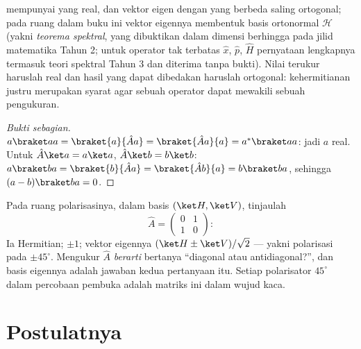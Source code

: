 \begin{theorem}\label{thm:b3:quantum-formalism:hermitian}
 mempunyai  yang real, dan vektor eigen
dengan  yang berbeda saling ortogonal; pada ruang dalam buku
ini vektor eigennya membentuk basis ortonormal $\mathcal H$ (yakni
\emph{teorema spektral}, yang dibuktikan dalam dimensi berhingga pada
jilid matematika Tahun 2; untuk operator tak terbatas $\hat x$, $\hat p$,
$\hat H$ pernyataan lengkapnya termasuk teori spektral Tahun 3 dan
diterima tanpa bukti). Nilai terukur haruslah real dan hasil yang dapat
dibedakan haruslah ortogonal: kehermitianan justru merupakan syarat agar
sebuah operator dapat mewakili sebuah pengukuran.
\end{theorem}

\begin{proof}[Bukti sebagian]
$a\braket aa = \braket{a}{\hat Aa} = \braket{\hat Aa}{a} =
a^*\braket aa$: jadi $a$ real. Untuk $\hat A\ket a = a\ket a$, $\hat A\ket b
= b\ket b$: $a\braket ba = \braket{b}{\hat Aa} = \braket{\hat
Ab}{a} = b\braket ba$, sehingga $(a - b)\braket ba = 0$.
\end{proof}

\begin{example}\label{ex:b3:quantum-formalism:twolevel}
Pada ruang polarisasinya, dalam basis $(\ket H, \ket V)$, tinjaulah
\[
\hat A = \begin{pmatrix} 0 & 1\\ 1 & 0\end{pmatrix} :
\]
Ia Hermitian;  $\pm1$; vektor eigennya $(\ket H \pm
\ket V)/\sqrt2$ --- yakni polarisasi pada $\pm45^\circ$. Mengukur
$\hat A$ \emph{berarti} bertanya ``diagonal atau antidiagonal?'', dan
basis eigennya adalah jawaban kedua pertanyaan itu. Setiap polarisator
$45^\circ$ dalam percobaan pembuka adalah matriks ini dalam wujud kaca.
\end{example}

\section{Postulatnya}

